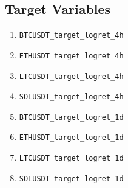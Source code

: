 \documentclass[12pt,a4paper]{article}
\begin{document}
\subsection{Target Variables}
\begin{enumerate}
    \item \texttt{BTCUSDT\_target\_logret\_4h}
    \item \texttt{ETHUSDT\_target\_logret\_4h}
    \item \texttt{LTCUSDT\_target\_logret\_4h}
    \item \texttt{SOLUSDT\_target\_logret\_4h}
    \item \texttt{BTCUSDT\_target\_logret\_1d}
    \item \texttt{ETHUSDT\_target\_logret\_1d}
    \item \texttt{LTCUSDT\_target\_logret\_1d}
    \item \texttt{SOLUSDT\_target\_logret\_1d}
\end{enumerate}
\end{document}

